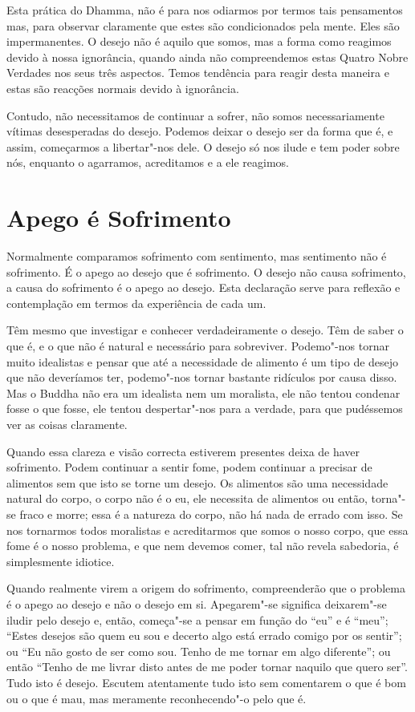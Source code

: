 Esta prática do Dhamma, não é para nos odiarmos por termos tais pensamentos mas,
para observar claramente que estes são condicionados pela mente. Eles são
impermanentes. O desejo não é aquilo que somos, mas a forma como reagimos devido
à nossa ignorância, quando ainda não compreendemos estas Quatro Nobre Verdades
nos seus três aspectos. Temos tendência para reagir desta maneira e estas são
reacções normais devido à ignorância.

Contudo, não necessitamos de continuar a sofrer, não somos necessariamente
vítimas desesperadas do desejo. Podemos deixar o desejo ser da forma que é, e
assim, começarmos a libertar"-nos dele. O desejo só nos ilude e tem poder sobre
nós, enquanto o agarramos, acreditamos e a ele reagimos.

\section{Apego é Sofrimento}

Normalmente comparamos sofrimento com sentimento, mas sentimento não é
sofrimento. É o apego ao desejo que é sofrimento. O desejo não causa sofrimento,
a causa do sofrimento é o apego ao desejo. Esta declaração serve para reflexão e
contemplação em termos da experiência de cada um.

Têm mesmo que investigar e conhecer verdadeiramente o desejo. Têm de saber o que
é, e o que não é natural e necessário para sobreviver. Podemo"-nos tornar muito
idealistas e pensar que até a necessidade de alimento é um tipo de desejo que
não deveríamos ter, podemo"-nos tornar bastante ridículos por causa disso. Mas o
Buddha não era um idealista nem um moralista, ele não tentou condenar fosse o
que fosse, ele tentou despertar"-nos para a verdade, para que pudéssemos ver as
coisas claramente.

Quando essa clareza e visão correcta estiverem presentes deixa de haver
sofrimento. Podem continuar a sentir fome, podem continuar a precisar de
alimentos sem que isto se torne um desejo. Os alimentos são uma necessidade
natural do corpo, o corpo não é o eu, ele necessita de alimentos ou então,
torna"-se fraco e morre; essa é a natureza do corpo, não há nada de errado com
isso. Se nos tornarmos todos moralistas e acreditarmos que somos o nosso corpo,
que essa fome é o nosso problema, e que nem devemos comer, tal não revela
sabedoria, é simplesmente idiotice.

Quando realmente virem a origem do sofrimento, compreenderão que o problema é o
apego ao desejo e não o desejo em si. Apegarem"-se significa deixarem"-se iludir
pelo desejo e, então, começa"-se a pensar em função do “eu” e é “meu”; “Estes
desejos são quem eu sou e decerto algo está errado comigo por os sentir”; ou “Eu
não gosto de ser como sou. Tenho de me tornar em algo diferente”; ou então
“Tenho de me livrar disto antes de me poder tornar naquilo que quero ser”. Tudo
isto é desejo. Escutem atentamente tudo isto sem comentarem o que é bom ou o que
é mau, mas meramente reconhecendo"-o pelo que é.


